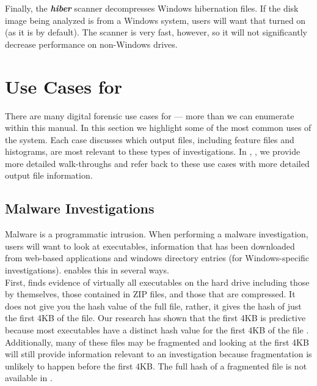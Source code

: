 \documentclass[11pt]{article} %
\begin{document}
Finally, the  \textbf{\textit{hiber}} scanner decompresses Windows hibernation files. If the disk image being analyzed is from a Windows system, \bulk users will want that turned on (as it is by default). The scanner is very fast, however, so it will not significantly decrease performance on non-Windows drives.

\section{Use Cases for \bulk}
There are many digital forensic use cases for \bulk --- more than we can enumerate within this manual. In this section we highlight some of the most common uses of the system. Each case discusses which output files, including feature files and histograms, are most relevant to these types of investigations.  In \textbf{}, \textbf{}, we provide more detailed walk-throughs and refer back to these use cases with more detailed output file information.

\subsection{Malware Investigations}
\label{malware}
Malware is a programmatic intrusion. When performing a malware investigation, users will want to look at executables, information that has been downloaded from web-based applications and windows directory entries (for Windows-specific investigations). \bulk enables this in several ways. \\

First, \bulk finds evidence of virtually all executables on the hard drive including those by themselves, those contained in ZIP files, and those that are compressed. It does not give you the hash value of the full file, rather, it gives the hash of just the first 4KB of the file. Our research has shown that the first 4KB is predictive because most executables have a distinct hash value for the first 4KB of the file \cite{hashEncoding}. Additionally, many of these files may be fragmented and looking at the first 4KB will still provide information relevant to an investigation because fragmentation is unlikely to happen before the first 4KB. The full hash of a fragmented file is not available in \bulk.\\ 
\end{document}
